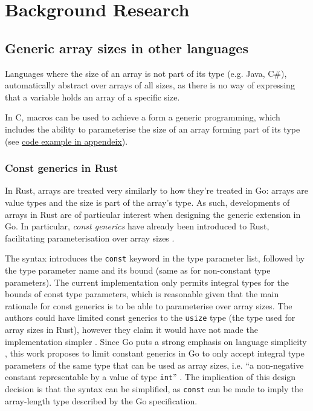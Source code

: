 \section{Background Research}

\subsection{Generic array sizes in other languages}

Languages where the size of an array is not part of its type (e.g. Java, C\#),
automatically abstract over arrays of all sizes, as there is no way of
expressing that a variable holds an array of a specific size.

In C, macros can be used to achieve a form a generic programming, which includes
the ability to parameterise the size of an array forming part of its type (see
\hyperref[sec:generic-c]{code example in appendeix}).

\subsubsection{Const generics in Rust}

In Rust, arrays are treated very similarly to how they're treated in Go: arrays
are value types and the size is part of the array's type. As such, developments
of arrays in Rust are of particular interest when designing the generic
extension in Go. In particular, \emph{const generics} have already been
introduced to Rust, facilitating parameterisation over array sizes
\autocite{rustConstBlog}.

The syntax introduces the \texttt{const} keyword in the type parameter list,
followed by the type parameter name and its bound (same as for non-constant type
parameters). The current implementation only permits integral types for the
bounds of const type parameters, which is reasonable given that the main
rationale for const generics is to be able to parameterise over array sizes. The
authors could have limited const generics to the \texttt{usize} type (the type
used for array sizes in Rust), however they claim it would have not made the
implementation simpler \autocite{rustConstRFC}. Since Go puts a strong emphasis
on language simplicity \autocite{goSimplicity}, this work proposes to limit
constant generics in Go to only accept integral type parameters of the same type
that can be used as array sizes, i.e. ``a non-negative constant representable by
a value of type \texttt{int}'' \autocite{spec}. The implication of this design
decision is that the syntax can be simplified, as \texttt{const} can be made to
imply the array-length type described by the Go specification.

